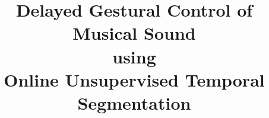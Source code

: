 \documentclass{nime-alternate_MANUSCRIPT} %
\begin{document}


\title{Delayed Gestural Control of Musical Sound \\
using \\
Online Unsupervised Temporal Segmentation}

%
%
%
%
\end{document}
